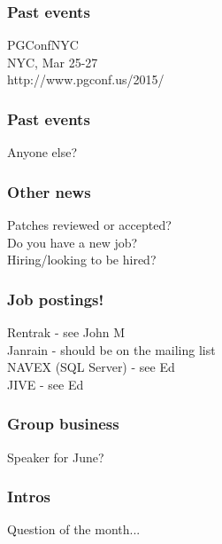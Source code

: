 \documentclass{beamer}
\begin{document}
\frame
{
  \frametitle{Past events}
  \begin{center}
{\large PGConfNYC\\}
NYC, Mar 25-27\\
http://www.pgconf.us/2015/\\
\vspace{5 mm}
  \end{center}
}

\frame
{
  \frametitle{Past events}
  \begin{center}
Anyone else?\\
  \end{center}
}

\frame
{
  \frametitle{Other news}
  \begin{center}
Patches reviewed or accepted?\\
Do you have a new job?\\
Hiring/looking to be hired?\\
  \end{center}
}

\frame
{
  \frametitle{Job postings!}
  \begin{center}
Rentrak - see John M\\
\vspace{5 mm}
Janrain - should be on the mailing list\\
\vspace{5 mm}
NAVEX (SQL Server) - see Ed\\
\vspace{5 mm}
JIVE - see Ed \\
  \end{center}
}

\frame
{
  \frametitle{Group business}
  \begin{center}
Speaker for June?\\
  \end{center}
}

\frame
{
  \frametitle{Intros}
  \begin{center}
Question of the month...\\
  \end{center}
}
\end{document}
